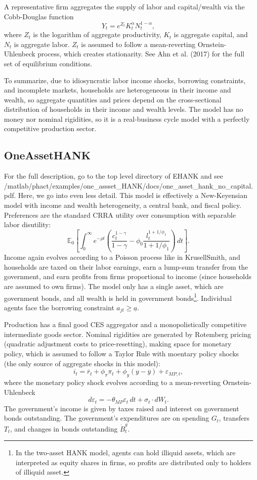 \documentclass[12 pt, oneside]{article}
\theoremstyle{definition}
\theoremstyle{definition}
\theoremstyle{definition}
\newcommand{\E}{\mathbb{E}}
\begin{document}
A representative firm aggregates the supply of labor and capital/wealth via the Cobb-Douglas function
\[ Y_t = e^{Z_t}K_t^\alpha N_t^{1-\alpha}, \]
where $Z_t$ is the logarithm of aggregate productivity, $K_t$ is aggregate capital, and $N_t$ is aggregate labor. $Z_t$ is assumed to follow a mean-reverting Ornstein-Uhlenbeck process, which creates stationarity. See Ahn et al. (2017) for the full set of equilibrium conditions.

To summarize, due to idiosyncratic labor income shocks, borrowing constraints, and incomplete markets, households are heterogeneous in their income and wealth, so aggregate quantities and prices depend on the cross-sectional distribution of households in their income and wealth levels. The model has no money nor nominal rigidities, so it is a real-business cycle model with a perfectly competitive production sector.



\subsection{OneAssetHANK}
For the full description, go to the top level directory of EHANK and see /matlab/phact/examples/one\_assset\_HANK/docs/one\_asset\_hank\_no\_capital.pdf. Here, we go into even less detail. This model is effectively a New-Keyensian model with income and wealth heterogeneity, a central bank, and fiscal policy. Preferences are the standard CRRA utility over consumption with separable labor disutility:
\[\E_0\left[ \int_0^\infty e^{-\rho t}\left(\dfrac{c_t^{1-\gamma}}{1-\gamma} - \phi_0\dfrac{l_t^{1+1/\phi_1}}{1+1/\phi_1}\right)\,dt \right]. \]
Income again evolves according to a Poisson process like in KrusellSmith, and households are taxed on their labor earnings, earn a lump-sum transfer from the government, and earn profits from firms proportional to income (since households are assumed to own firms). The model only has a single asset, which are government bonds, and all wealth is held in government bonds\footnote{In the two-asset HANK model, agents can hold illiquid assets, which are interpreted as equity shares in firms, so profits are distributed only to holders of illiquid asset.}. Individual agents face the borrowing constraint $a_{jt}\geq \underline{a}$.

Production has a final good CES aggregator and a monopolistically competitive intermediate goods sector. Nominal rigidities are generated by Rotemberg pricing (quadratic adjustment costs to price-resetting), making space for monetary policy, which is assumed to follow a Taylor Rule with moentary policy shocks (the only source of aggregate shocks in this model):
\[i_t = \overline{r}_t + \phi_\pi\pi_t + \phi_y(y - \overline{y}) + \varepsilon_{MP,t},  \]
where the monetary policy shock evolves according to a mean-reverting Ornstein-Uhlenbeck
\[d\varepsilon_t = -\theta_{MP}\varepsilon_t\,dt + \sigma_t\cdot dW_t.  \]
The government's income is given by taxes raised and interest on government bonds outstanding. The government's expenditures are on spending $G_t$, transfers $T_t$, and changes in bonds outstanding $\dot{B}_t^g$.
\end{document}
